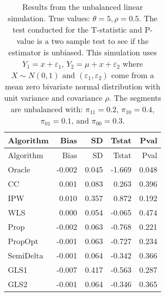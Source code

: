 \documentclass[
  letterpaper,
  DIV=11,
  numbers=noendperiod]{scrartcl}
\begin{document}
\begin{longtable}[]{@{}lrrrr@{}}
\caption{Results from the unbalanced linear simulation. True values:
\(\theta = 5, \rho = 0.5\). The test conducted for the T-statistic and
P-value is a two sample test to see if the estimator is unbiased. This
simulation uses \(Y_1 = x + \varepsilon_1\),
\(Y_2 = \mu + x + \varepsilon_2\) where \(X \sim N(0, 1)\) and
\((\varepsilon_1, \varepsilon_2)\) come from a mean zero bivariate
normal distribution with unit variance and covariance \(\rho\). The
segments are unbalanced with: \(\pi_{11} = 0.2\), \(\pi_{10} = 0.4\),
\(\pi_{01} = 0.1\), and \(\pi_{00} = 0.3\). }\tabularnewline
\toprule\noalign{}
Algorithm & Bias & SD & Tstat & Pval \\
\midrule\noalign{}
\endfirsthead
\toprule\noalign{}
Algorithm & Bias & SD & Tstat & Pval \\
\midrule\noalign{}
\endhead
\bottomrule\noalign{}
\endlastfoot
Oracle & -0.002 & 0.045 & -1.669 & 0.048 \\
CC & 0.001 & 0.083 & 0.263 & 0.396 \\
IPW & 0.010 & 0.357 & 0.872 & 0.192 \\
WLS & 0.000 & 0.054 & -0.065 & 0.474 \\
Prop & -0.002 & 0.063 & -0.768 & 0.221 \\
PropOpt & -0.001 & 0.063 & -0.727 & 0.234 \\
SemiDelta & -0.001 & 0.064 & -0.342 & 0.366 \\
GLS1 & -0.007 & 0.417 & -0.563 & 0.287 \\
GLS2 & -0.001 & 0.064 & -0.346 & 0.365 \\
\end{longtable}
\end{document}
